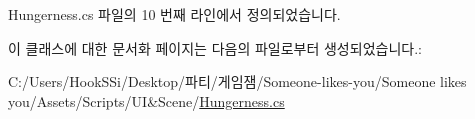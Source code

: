 Hungerness.\+cs 파일의 10 번째 라인에서 정의되었습니다.



이 클래스에 대한 문서화 페이지는 다음의 파일로부터 생성되었습니다.\+:\begin{DoxyCompactItemize}
\item 
C\+:/\+Users/\+Hook\+S\+Si/\+Desktop/파티/게임잼/\+Someone-\/likes-\/you/\+Someone likes you/\+Assets/\+Scripts/\+U\+I\&\+Scene/\mbox{\hyperlink{_hungerness_8cs}{Hungerness.\+cs}}\end{DoxyCompactItemize}
